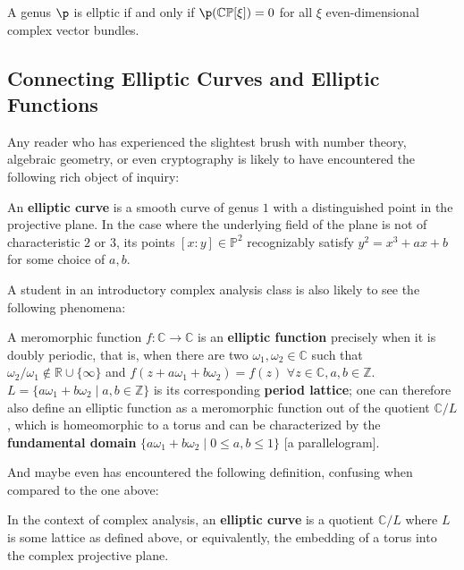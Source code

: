 \begin{theorem}
    A genus $\p$ is ellptic if and only if $\p(\mathbb{CP}[\xi]) = 0$ for all $\xi$ even-dimensional complex vector bundles.
\end{theorem}

\subsection{Connecting Elliptic Curves and Elliptic Functions}

Any reader who has experienced the slightest brush with number theory, algebraic geometry, or even cryptography is likely to have encountered the following rich object of inquiry:

\begin{definition}
    An \textbf{elliptic curve} is a smooth curve of genus $1$ with a distinguished point in the projective plane. In the case where the underlying field of the plane is not of characteristic $2$ or $3$,  its points $[x: y] \in \mathbb{P}^2$ recognizably satisfy $y^2 = x^3 + ax +b$ for some choice of $a, b$. 
\end{definition}

A student in an introductory complex analysis class is also likely to see the following phenomena:

\begin{definition}
A meromorphic function  $f: \mathbb{C} \to \mathbb{C}$ is an \textbf{elliptic function} precisely when it is doubly periodic, that is, when there are two $\omega_1, \omega_2 \in \mathbb{C}$ such that $\omega_2/\omega_1 \notin \mathbb{R} \cup \{\infty \}$ and $f(z + a \omega_1 + b \omega_2) = f(z)$ $\forall z \in \mathbb{C}, a, b \in \mathbb{Z}$. $L = \{a \omega_1 + b \omega_2 \mid a, b \in \mathbb{Z} \}$ is its corresponding \textbf{period lattice}; one can therefore also define an elliptic function as a meromorphic function out of the quotient $\mathbb{C} / L$, which is homeomorphic to a torus and can be characterized by the \textbf{fundamental domain} $\{ a \omega_1 + b \omega_2 \mid 0 \leq a, b \leq 1\}$ [a parallelogram]. 
\end{definition}

And maybe even has encountered the following definition, confusing when compared to the one above:

\begin{definition}
    In the context of complex analysis, an \textbf{elliptic curve} is a quotient $\mathbb{C} / L$ where $L$ is some lattice as defined above, or equivalently, the embedding of a torus into the complex projective plane. 
\end{definition}

